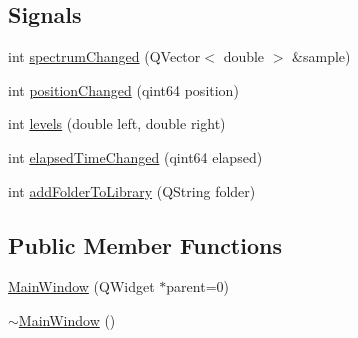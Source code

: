\subsection*{Signals}
\begin{DoxyCompactItemize}
\item 
int \hyperlink{class_main_window_a0db59b0091efb9ef939245562e84b79a}{spectrum\-Changed} (Q\-Vector$<$ double $>$ \&sample)
\item 
int \hyperlink{class_main_window_a8df9e5e5d0997eb8e5ecdbcf42bb57ca}{position\-Changed} (qint64 position)
\item 
int \hyperlink{class_main_window_a59803bb114724dc5f3717dc28539f164}{levels} (double left, double right)
\item 
int \hyperlink{class_main_window_ad255b6b8019a66a663a9c1de04d42a80}{elapsed\-Time\-Changed} (qint64 elapsed)
\item 
int \hyperlink{class_main_window_a659d33ceffcceae28005205fe44edda4}{add\-Folder\-To\-Library} (Q\-String folder)
\end{DoxyCompactItemize}
\subsection*{Public Member Functions}
\begin{DoxyCompactItemize}
\item 
\hyperlink{class_main_window_a8b244be8b7b7db1b08de2a2acb9409db}{Main\-Window} (Q\-Widget $\ast$parent=0)
\item 
\hyperlink{class_main_window_ae98d00a93bc118200eeef9f9bba1dba7}{$\sim$\-Main\-Window} ()
\end{DoxyCompactItemize}



